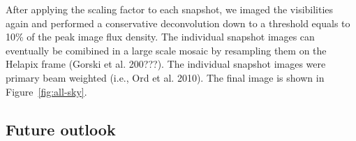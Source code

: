 \documentclass[a0,portrait]{a0poster}
\begin{document}
\begin{multicols}{2}
After applying the scaling factor to each snapshot, we imaged the visibilities again and performed a conservative deconvolution down to a threshold equals to 10\% of the peak image flux density. The individual snapshot images can eventually be comibined in a large scale mosaic by resampling them on the Helapix frame (Gorski et al. 200???). The individual snapshot images were primary beam weighted (i.e., Ord et al. 2010). The final image is shown in Figure~\ref{fig:all-sky}.

\subsection*{Future outlook}
%
%  
%
%


\end{multicols}
\end{document}
